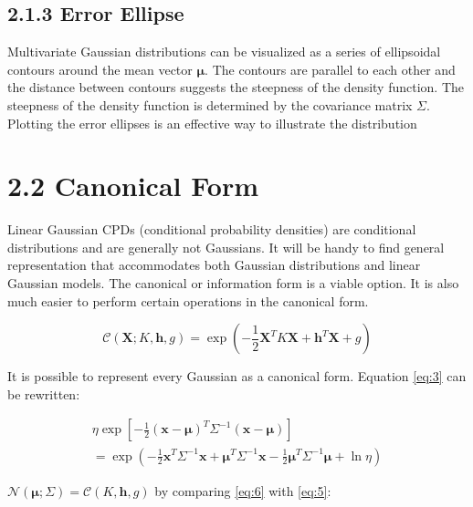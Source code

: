 \documentclass[12pt,oneside,openany,a4paper, %
afrikaans,english,
]{memoir}
\numberwithin{equation}{chapter}
\begin{document}
\subsection{2.1.3 Error Ellipse}
Multivariate Gaussian distributions can be visualized as a series of ellipsoidal contours around the mean vector $\bm{\mu}$. The contours are parallel to each other and the distance between contours suggests the steepness of the density function. The steepness of the density function is determined by the covariance matrix $\Sigma$.\\
Plotting the error ellipses is an effective way to illustrate the distribution

\section{2.2 Canonical Form}
Linear Gaussian CPDs (conditional probability densities) are conditional distributions and are generally not Gaussians. It will be handy to find general representation that accommodates both Gaussian distributions and linear Gaussian models. The canonical or information form is a viable option. It is also much easier to perform certain operations in the canonical form. 

\begin{equation}\label{eq:5}
\mathcal{C}(\bm{X}; K,\bm{h},g) = \exp\left(-\frac{1}{2}\bm{X}^TK\bm{X} + \bm{h}^T\bm{X} +g \right)
\end{equation}


It is possible to represent every Gaussian as a canonical form. Equation \ref{eq:3} can be rewritten:


\begin{multline}\label{eq:6}
\eta\exp\left[-\frac{1}{2}(\bm{x}-\bm{\mu})^T\Sigma^{-1}(\bm{x}-\bm{\mu})\right]
\\ = \exp\left(-\frac{1}{2}\bm{x}^T\Sigma^{-1}\bm{x} + \bm{\mu}^T\Sigma^{-1}\bm{x} - \frac{1}{2}\bm{\mu}^T\Sigma^{-1}\bm{\mu} + \ln{\eta}\right)
\end{multline}


$\mathcal{N}(\bm{\mu}; \Sigma) = \mathcal{C}(K,\bm{h}, g)$ by comparing \ref{eq:6} with \ref{eq:5}:
\end{document}
